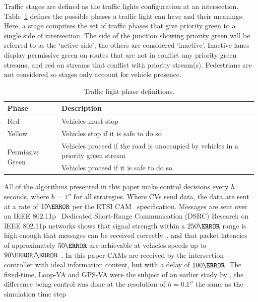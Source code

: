 \documentclass[numbered]{trbunofficial}
\newcommand{\sidiv}{/\hspace{-1.5pt}} %
\begin{document}
Traffic stages are defined as the traffic lights configuration at an intersection. Table~\ref{tab:tlType} defines the possible phases a traffic light can have and their meanings. Here, a stage comprises the set of traffic phases that give priority green to a single side of intersection. The side of the junction showing priority green will be referred to as the `active side', the others are considered `inactive'. Inactive lanes display permissive green on routes that are not in conflict any priority green streams, and red on streams that conflict with priority stream(s). Pedestrians are not considered so stages only account for vehicle presence.

\begin{table}[htb]
	\small
	\centering
	\caption{Traffic light phase definitions.\vspace{-1.0ex}}
	\begin{tabular}{p{2.5cm}p{7cm} }
		\toprule
		\textbf{Phase} & \textbf{Description} \\ \toprule
		Red & Vehicles must stop \\ \midrule
		Yellow & Vehicles stop if it is safe to do so \\ \midrule
		\multirow{2}{2.5cm}{Permissive Green} & Vehicles proceed if the road is unoccupied by vehicles in a priority green stream \\ \midrule
		Priority Green & Vehicles proceed if it is safe to do so \\ 
		\bottomrule
	\end{tabular}
	\label{tab:tlType}
\end{table}

All of the algorithms presented in this paper make control decisions every $h$ seconds, where $h=1\second$ for all strategies.  Where CVs send data, the data are sent at a rate of $10\Hz$ per the ETSI CAM~\cite{EtsiCAM2011}  specification. Messages are sent over an IEEE 802.11p~\cite{ieee80211p} Dedicated Short-Range Communication (DSRC) Research on IEEE 802.11p networks shows that signal strength within a $250\m$ range is high enough that messages can be received correctly~\cite{msadaa2010, hameedmir2014}, and that packet latencies of approximately $50\ms$ are achievable at vehicles speeds up to $90\km\sidiv\hour$~\cite{msadaa2010}. In this paper CAMs are received by the intersection controller with ideal information content, but with a delay of $100\ms$. The fixed-time, Loop-VA and GPS-VA were the subject of an earlier study by , the difference being control was done at the resolution of $h=0.1\second$ the same as the simulation time step
\end{document}
